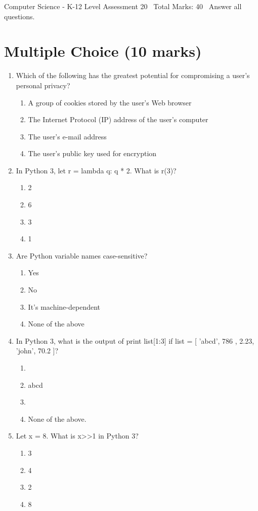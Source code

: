 \documentclass[12pt]{article}
\begin{document}
\begin{center}
Computer Science - K-12 Level Assessment 20 \
Total Marks: 40 \
Answer all questions.
\end{center}

\section*{Multiple Choice (10 marks)}
\begin{enumerate}[label=\arabic*.]
\item Which of the following has the greatest potential for compromising a user's personal privacy?
\begin{enumerate}[label=(\alph*)]
    \item A group of cookies stored by the user's Web browser
    \item The Internet Protocol (IP) address of the user's computer
    \item The user's e-mail address
    \item The user's public key used for encryption
\end{enumerate}
\item In Python 3, let r = lambda q: q * 2. What is r(3)?
\begin{enumerate}[label=(\alph*)]
    \item 2
    \item 6
    \item 3
    \item 1
\end{enumerate}
\item Are Python variable names case-sensitive?
\begin{enumerate}[label=(\alph*)]
    \item Yes
    \item No
    \item It's machine-dependent
    \item None of the above
\end{enumerate}
\item In Python 3, what is the output of print list[1:3] if list = [ 'abcd', 786 , 2.23, 'john', 70.2 ]?
\begin{enumerate}[label=(\alph*)]
    \item [ 'abcd', 786 , 2.23, 'john', 70.2 ]
    \item abcd
    \item [786, 2.23]
    \item None of the above.
\end{enumerate}
\item Let x = 8. What is x\textgreater{}\textgreater{}1 in Python 3?
\begin{enumerate}[label=(\alph*)]
    \item 3
    \item 4
    \item 2
    \item 8
\end{enumerate}
\end{enumerate}
\end{document}

